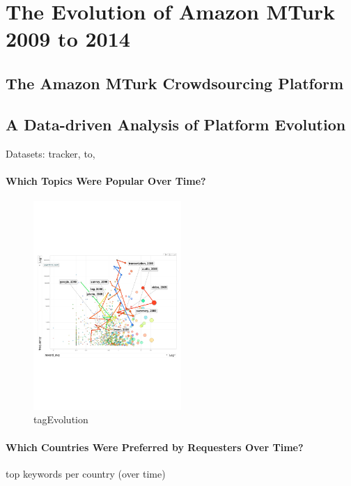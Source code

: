 \section{The Evolution of Amazon MTurk 2009 to 2014}\label{sec:stats}

\subsection{The Amazon MTurk Crowdsourcing Platform}\label{sec:tracker}


\subsection{A Data-driven Analysis of Platform Evolution}
Datasets: tracker, to, 
\paragraph{Which Topics Were Popular Over Time?}

\begin{figure}[htbp]
	\centering
		\includegraphics[width=0.5\textwidth]{figures/tagEvolution}
	\caption{tagEvolution}
	\label{fig:tagEvolution}
\end{figure}

\paragraph{Which Countries Were Preferred by Requesters Over Time?}
top keywords per country (over time)

